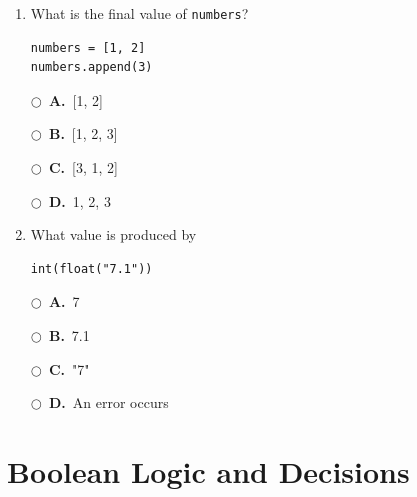 \documentclass[11pt]{article}
\newcommand{\choice}[2]{%
    \par\noindent
    \(\bigcirc\)\ \textbf{#1.}\ #2
}
\begin{document}
\begin{enumerate}

\item What is the final value of \texttt{numbers}?

\begin{verbatim}
numbers = [1, 2]
numbers.append(3)
\end{verbatim}

\choice{A}{[1, 2]}
\choice{B}{[1, 2, 3]}
\choice{C}{[3, 1, 2]}
\choice{D}{1, 2, 3}



\item What value is produced by

\begin{verbatim}
int(float("7.1"))
\end{verbatim}

\choice{A}{7}
\choice{B}{7.1}
\choice{C}{"7"}
\choice{D}{An error occurs}

\end{enumerate}


\section*{Boolean Logic and Decisions}
\end{document}
